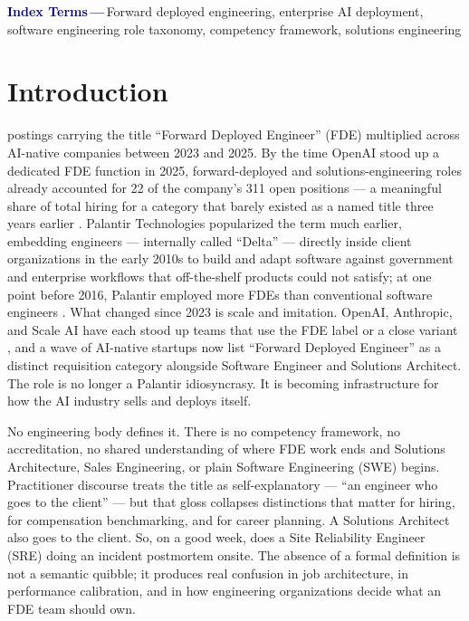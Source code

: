 \documentclass[journal]{IEEEtran}
\begin{document}
\begin{IEEEkeywords}
\begin{mdframed}[
  linecolor=darkblue!35, linewidth=0.8pt,
  backgroundcolor=darkblue!3,
  innerleftmargin=8pt, innerrightmargin=8pt,
  innertopmargin=5pt, innerbottommargin=5pt,
  roundcorner=3pt, skipabove=0pt, skipbelow=4pt
]
\noindent\textbf{\textcolor{darkblue}{Index Terms\,---\,}}Forward deployed engineering, enterprise AI deployment, software engineering role taxonomy, competency framework, solutions engineering
\end{mdframed}
\end{IEEEkeywords}

\section{Introduction}
\label{sec:intro}

 postings carrying the title ``Forward Deployed Engineer'' (FDE) multiplied across AI-native companies between 2023 and 2025. By the time OpenAI stood up a dedicated FDE function in 2025, forward-deployed and solutions-engineering roles already accounted for 22 of the company's 311 open positions --- a meaningful share of total hiring for a category that barely existed as a named title three years earlier \cite{schmidt2025servicesledgrowth}. Palantir Technologies popularized the term much earlier, embedding engineers --- internally called ``Delta'' --- directly inside client organizations in the early 2010s to build and adapt software against government and enterprise workflows that off-the-shelf products could not satisfy; at one point before 2016, Palantir employed more FDEs than conventional software engineers \cite{orosz2025fde,palantir2026fdse}. What changed since 2023 is scale and imitation. OpenAI, Anthropic, and Scale AI have each stood up teams that use the FDE label or a close variant \cite{openai2026fdelifesciences,anthropic2026fde,scaleai2026fde}, and a wave of AI-native startups now list ``Forward Deployed Engineer'' as a distinct requisition category alongside Software Engineer and Solutions Architect. The role is no longer a Palantir idiosyncrasy. It is becoming infrastructure for how the AI industry sells and deploys itself.

No engineering body defines it. There is no competency framework, no accreditation, no shared understanding of where FDE work ends and Solutions Architecture, Sales Engineering, or plain Software Engineering (SWE) begins. Practitioner discourse treats the title as self-explanatory --- ``an engineer who goes to the client'' --- but that gloss collapses distinctions that matter for hiring, for compensation benchmarking, and for career planning. A Solutions Architect also goes to the client. So, on a good week, does a Site Reliability Engineer (SRE) doing an incident postmortem onsite. The absence of a formal definition is not a semantic quibble; it produces real confusion in job architecture, in performance calibration, and in how engineering organizations decide what an FDE team should own.
\end{document}

